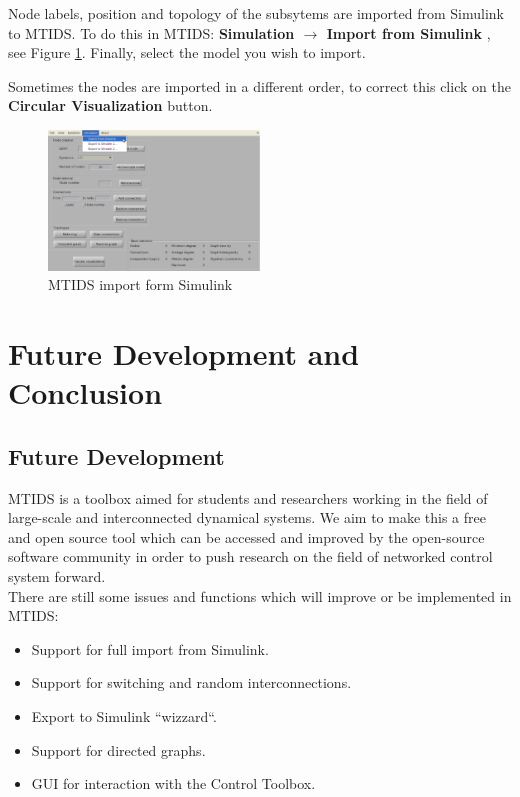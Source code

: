 \documentclass[a4paper,twoside, openright,12pt]{report}
\begin{document}
Node labels, position and topology of the subsytems are imported from Simulink to MTIDS.
To do this in MTIDS: \textbf{Simulation $\rightarrow$ Import from Simulink }, see Figure \ref{mtidsImportFig}. Finally, select the model you wish to import.

Sometimes the nodes are imported in a different order, to correct this click on the \textbf{Circular Visualization} button. 

\begin{figure}[htb]
\centering
\includegraphics[width=0.5\textwidth]{pics/mtidsImport.eps}
\caption[MTIDS import form Simulink]{MTIDS import form Simulink}
\label{mtidsImportFig}
\end{figure} 

\chapter{Future Development and Conclusion}


\section{Future Development}

MTIDS is a toolbox aimed for students and researchers working in the field of large-scale and interconnected dynamical systems. 
We aim to make this a free and open source tool which can be accessed and improved by the open-source software community in order to
 push research on the field of networked control system forward.\\

There are still some issues and functions which will improve or be implemented in MTIDS:
\begin{itemize}
 \item Support for full import from Simulink.
 \item Support for switching and random interconnections.
 \item Export to Simulink ``wizzard``.
 \item Support for directed graphs.
 \item GUI for interaction with the Control Toolbox.
\end{itemize}
\vspace{5cm} 
\pagebreak 
\end{document}
